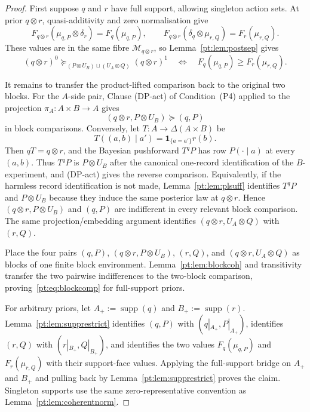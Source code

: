 \documentclass[11pt,a4paper]{article}
\theoremstyle{definition}
\newcommand{\1}{\mathbf 1}
\begin{document}
\begin{proof}
First suppose $q$ and $r$ have full support, allowing singleton action sets.  At prior $q\otimes r$, quasi-additivity and
zero normalisation give
\[
F_{q\otimes r}(\mu_{q,P}\otimes\delta_r)=F_q(\mu_{q,P}),
\qquad
F_{q\otimes r}(\delta_q\otimes\mu_{r,Q})=F_r(\mu_{r,Q}).
\]
These values are in the same fibre $\mathcal M_{q\otimes r}$, so Lemma~\ref{pt:lem:postsep} gives
\[
(q\otimes r)^0\succeq_{(P\otimes U_B)\sqcup(U_A\otimes Q)}(q\otimes r)^1
\quad\Longleftrightarrow\quad
F_q(\mu_{q,P})\ge F_r(\mu_{r,Q}).
\]

It remains to transfer the product-lifted comparison back to the original two blocks.  For the $A$-side pair,
Clause \textup{(DP-act)} of Condition~\textup{(P4)} applied to the projection $\pi_A:A\times B\to A$ gives
\[
(q\otimes r,P\otimes U_B)\succeq(q,P)
\]
in block comparisons.  Conversely, let $T:A\to\Delta(A\times B)$ be
\[
T((a,b)\mid a')=\1_{\{a=a'\}}r(b).
\]
Then $qT=q\otimes r$, and the Bayesian pushforward $T^qP$ has row $P(\cdot\mid a)$ at every $(a,b)$.  Thus
$T^qP$ is $P\otimes U_B$ after the canonical one-record identification of the $B$-experiment, and \textup{(DP-act)}
gives the reverse comparison.  Equivalently, if the harmless record identification is not made, Lemma~\ref{pt:lem:plsuff}
identifies $T^qP$ and $P\otimes U_B$ because they induce the same posterior law at $q\otimes r$.  Hence
$(q\otimes r,P\otimes U_B)$ and $(q,P)$ are indifferent in every relevant block comparison.  The same
projection/embedding argument identifies $(q\otimes r,U_A\otimes Q)$ with $(r,Q)$.

Place the four pairs $(q,P)$, $(q\otimes r,P\otimes U_B)$, $(r,Q)$, and $(q\otimes r,U_A\otimes Q)$ as blocks of one
finite block environment.  Lemma~\ref{pt:lem:blockcoh} and transitivity transfer the two pairwise indifferences to the
two-block comparison, proving~\eqref{pt:eq:blockcomp} for full-support priors.

For arbitrary priors, let $A_+:=\operatorname{supp}(q)$ and $B_+:=\operatorname{supp}(r)$.  Lemma~\ref{pt:lem:supprestrict}
identifies $(q,P)$ with $(q|_{A_+},P|_{A_+})$, identifies $(r,Q)$ with $(r|_{B_+},Q|_{B_+})$, and identifies the two
values $F_q(\mu_{q,P})$ and $F_r(\mu_{r,Q})$ with their support-face values.  Applying the full-support bridge on
$A_+$ and $B_+$ and pulling back by Lemma~\ref{pt:lem:supprestrict} proves the claim.  Singleton supports use the same
zero-representative convention as Lemma~\ref{pt:lem:coherentnorm}.
\end{proof}
\end{document}
